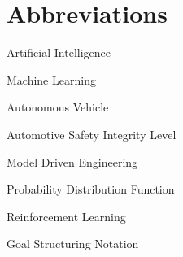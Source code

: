 


\section*{Abbreviations}
\begin{description}[font=\rmfamily\bfseries, leftmargin=3cm, style=nextline]
	\item[AI] Artificial Intelligence
	\item[ML] Machine Learning
	\item[AV] Autonomous Vehicle
	\item[ASIL] Automotive Safety Integrity Level
	\item[MDE] Model Driven Engineering
	\item[PDF] Probability Distribution Function
	\item[RL] Reinforcement Learning 
	\item[GSN] Goal Structuring Notation 
\end{description}
